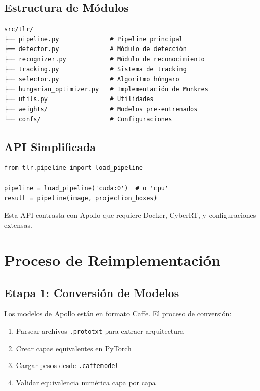 \subsection{Estructura de Módulos}

\begin{verbatim}
src/tlr/
├── pipeline.py              # Pipeline principal
├── detector.py              # Módulo de detección
├── recognizer.py            # Módulo de reconocimiento
├── tracking.py              # Sistema de tracking
├── selector.py              # Algoritmo húngaro
├── hungarian_optimizer.py   # Implementación de Munkres
├── utils.py                 # Utilidades
├── weights/                 # Modelos pre-entrenados
└── confs/                   # Configuraciones
\end{verbatim}

\subsection{API Simplificada}

\begin{codesnippet}
\begin{verbatim}
from tlr.pipeline import load_pipeline

pipeline = load_pipeline('cuda:0')  # o 'cpu'
result = pipeline(image, projection_boxes)
\end{verbatim}
\end{codesnippet}

Esta API contrasta con Apollo que requiere Docker, CyberRT, y configuraciones extensas.

\section{Proceso de Reimplementación}

\subsection{Etapa 1: Conversión de Modelos}

Los modelos de Apollo están en formato Caffe. El proceso de conversión:

\begin{enumerate}
    \item Parsear archivos \texttt{.prototxt} para extraer arquitectura
    \item Crear capas equivalentes en PyTorch
    \item Cargar pesos desde \texttt{.caffemodel}
    \item Validar equivalencia numérica capa por capa
\end{enumerate}


